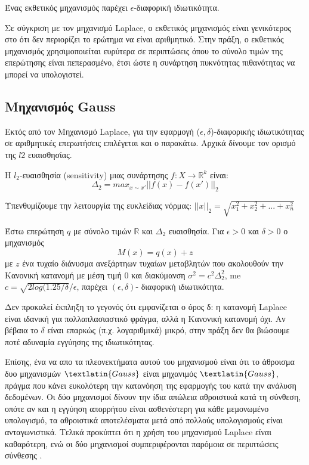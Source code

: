 \begin{theorem}
Ένας εκθετικός μηχανισμός παρέχει $\epsilon$-διαφορική ιδιωτικότητα.
\end{theorem}

Σε σύγκριση με τον μηχανισμό \textlatin{Laplace}, ο εκθετικός μηχανισμός είναι γενικότερος στο ότι δεν περιορίζει το ερώτημα να είναι αριθμητικό. Στην πράξη, ο εκθετικός μηχανισμός χρησιμοποιείται ευρύτερα σε περιπτώσεις όπου το σύνολο τιμών της επερώτησης είναι πεπερασμένο, έτσι ώστε η συνάρτηση πυκνότητας πιθανότητας να μπορεί να υπολογιστεί.



\subsection{Μηχανισμός \textlatin{Gauss}}

Εκτός από τον Μηχανισμό \textlatin{Laplace}, για την εφαρμογή ($\epsilon, \delta$)-διαφορικής ιδιωτικότητας σε αριθμητικές επερωτήσεις επιλέγεται και ο παρακάτω. Αρχικά δίνουμε τον ορισμό της $l2$ ευαισθησίας.

\begin{definition} 
 Η $l_2$-ευαισθησία (\textlatin{sensitivity}) μιας συνάρτησης $f:X \longrightarrow \mathbb{R}^k$ είναι:
$$\Delta_2=max_{x\sim x'}||f(x)-f(x')||_2$$
\end{definition}

Υπενθυμίζουμε την λειτουργία της ευκλείδιας νόρμας: $||x||_2=\sqrt{x_1^2+x_2^2+...+x_n^2}$

\begin{theorem}
Έστω επερώτηση $q$ με σύνολο τιμών $\mathbb{R}$ και $\Delta_2$ ευαισθησία. Για $\epsilon>0$ και $\delta>0$ ο μηχανισμός
$$M(x) = q(x) + z$$
με $z$ ένα τυχαίο διάνυσμα ανεξάρτηων τυχαίων μεταβλητών που ακολουθούν την Κανονική κατανομή με μέση τιμή 0 και διακύμανση $\sigma^2=c^2\Delta^2_2$, me $c=\sqrt{2log(1.25/\delta}/\epsilon$, παρέχει $(\epsilon, \delta)$- διαφορική ιδιωτικότητα.

\end{theorem}

 Δεν προκαλεί έκπληξη το γεγονός ότι εμφανίζεται ο όρος δ: η κατανομή \textlatin{Laplace} είναι ιδανική για πολλαπλασιαστικό φράγμα, αλλά η Κανονική κατανομή όχι.  Αν βέβαια το $\delta$ είναι επαρκώς (π.χ. λογαριθμικά) μικρό, στην πράξη δεν θα βιώσουμε ποτέ αδυναμία εγγύησης της ιδιωτικότητας. 
 
 Επίσης, ένα να απο τα πλεονεκτήματα αυτού του μηχανισμού είναι ότι το άθροισμα δυο μηχανισμών $\textlatin{Gauss}$ είναι μηχανιμός $\textlatin{Gauss}$, πράγμα που κάνει ευκολότερη την κατανόηση της εφαρμογής του κατά την ανάλυση δεδομένων. 
Οι δύο μηχανισμοί δίνουν την ίδια απώλεια αθροιστικά κατά τη σύνθεση, οπότε αν και η εγγύηση απορρήτου είναι ασθενέστερη για κάθε μεμονωμένο υπολογισμό, τα αθροιστικά αποτελέσματα μετά από πολλούς υπολογισμούς είναι ανταγωνιστικά. Τελικά προκύπτει ότι η χρήση του μηχανισμού \textlatin{Laplace} είναι καθαρότερη, ενώ οι δύο μηχανισμοί συμπεριφέρονται παρόμοια σε περιπτώσεις σύνθεσης \textlatin{\cite{Dwork:2010:BDP:1917827.1918366}}.


